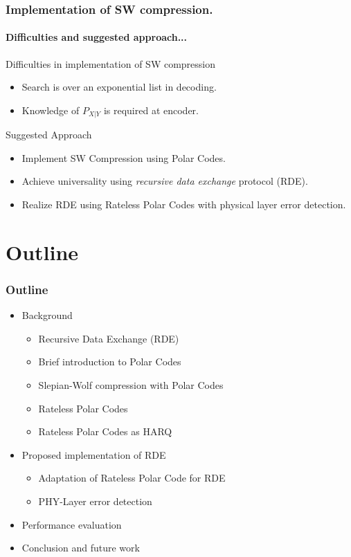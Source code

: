 \documentclass[xcolor=dvipsnames]{beamer}
\begin{document}
\begin{frame}
\frametitle{Implementation of SW compression.}
\framesubtitle{ Difficulties and suggested approach...}
Difficulties in implementation of SW compression
\begin{itemize}
\item Search is over an exponential list in decoding.
\item Knowledge of $P_{X|Y}$ is required at encoder.
\end{itemize}
\begin{block}{Suggested Approach}
\begin{itemize}
\item{Implement SW Compression using Polar Codes.}
\item{Achieve universality using \emph{recursive data exchange} protocol (RDE).}
\item{Realize RDE using Rateless Polar Codes with physical layer error detection.}
\end{itemize}
\end{block}
\end{frame}

\section{Outline}
\begin{frame}
\frametitle{Outline}
\begin{itemize}
\item Background
\begin{itemize}
\item{Recursive Data Exchange (RDE)}
\item{Brief introduction to Polar Codes}
\item{Slepian-Wolf compression with Polar Codes}
\item{Rateless Polar Codes}
\item{Rateless Polar Codes as HARQ}
\end{itemize}
\item Proposed implementation of RDE
\begin{itemize}
\item Adaptation of Rateless Polar Code for RDE
\item PHY-Layer error detection
\end{itemize}
\item Performance evaluation
\item Conclusion and future work
\end{itemize}
\end{frame}
\end{document}
